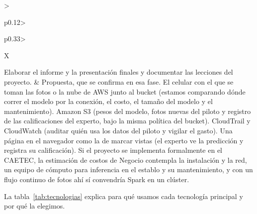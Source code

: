 \documentclass[11pt,letterpaper,DIV=12]{scrartcl}
\begin{document}
{\begin{xltabular}{\textwidth}{>{\raggedright\arraybackslash}p{0.12\textwidth}>{\raggedright\arraybackslash}p{0.33\textwidth}>{\raggedright\arraybackslash}X}
  \vineta Elaborar el informe y la presentación finales y documentar las lecciones del proyecto. &
  Propuesta, que se confirma en esa fase.
  \vineta El celular con el que se toman las fotos o la nube de AWS junto al bucket (estamos comparando dónde correr el modelo por la conexión, el costo, el tamaño del modelo y el mantenimiento).
  \vineta Amazon S3 (pesos del modelo, fotos nuevas del piloto y registro de las calificaciones del experto, bajo la misma política del bucket).
  \vineta CloudTrail y CloudWatch (auditar quién usa los datos del piloto y vigilar el gasto).
  \vineta Una página en el navegador como la de marcar vistas (el experto ve la predicción y registra su calificación).
  \vineta Si el proyecto se implementa formalmente en el CAETEC, la estimación de costos de Negocio contempla la instalación y la red, un equipo de cómputo para inferencia en el establo y su mantenimiento, y con un flujo continuo de fotos ahí sí convendría Spark en un clúster. \\
\end{xltabular}
}

La tabla~\ref{tab:tecnologias} explica para qué usamos cada tecnología principal y por qué la elegimos.
\end{document}
